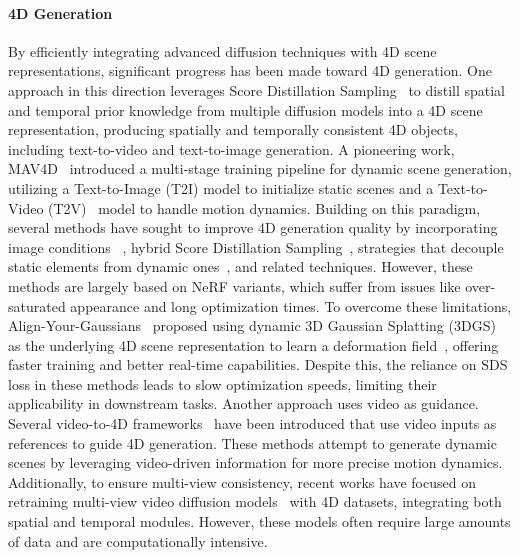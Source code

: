 \paragraph{4D Generation} By efficiently integrating advanced diffusion techniques with 4D scene representations, significant progress has been made toward 4D generation. One approach in this direction leverages Score Distillation Sampling~\citep{poole2022dreamfusion} to distill spatial and temporal prior knowledge from multiple diffusion models into a 4D scene representation, producing spatially and temporally consistent 4D objects, including text-to-video and text-to-image generation. 
A pioneering work, MAV4D~\citep{singer2023mav3d} introduced a multi-stage training pipeline for dynamic scene generation, utilizing a Text-to-Image (T2I) model to initialize static scenes and a Text-to-Video (T2V)~\citep{singer2022makeavideovd} model to handle motion dynamics.
Building on this paradigm, several methods have sought to improve 4D generation quality by incorporating image conditions ~\citep{zhao2023animate124}, hybrid Score Distillation Sampling~\citep{bahmani20244dfy}, strategies that decouple static elements from dynamic ones~\citep{zheng2024dreamin4d}, and related techniques. However, these methods are largely based on NeRF variants, which suffer from issues like over-saturated appearance and long optimization times. To overcome these limitations,  Align-Your-Gaussians~\citep{ling2024alignyourgauss} proposed using dynamic 3D Gaussian Splatting (3DGS)~\citep{kerbl20233dgs} as the underlying 4D scene representation to learn a deformation field~\citep{park2021nerfies,pons2021dnerf}, offering faster training and better real-time capabilities. Despite this, the reliance on SDS loss in these methods leads to slow optimization speeds, limiting their applicability in downstream tasks.
Another approach uses video as guidance. Several video-to-4D frameworks~\citep{jiang2023consistent4d,yin20234dgen,pan2024fastdy4d} have been introduced that use video inputs as references to guide 4D generation. These methods attempt to generate dynamic scenes by leveraging video-driven information for more precise motion dynamics.
Additionally, to ensure multi-view consistency, recent works have focused on retraining multi-view video diffusion models~\citep{zhang20244diffusion,liang2024diffusion4d,li2024vividzoo,ren2024l4gm,jiang2024animate3d} with 4D datasets, integrating both spatial and temporal modules. However, these models often require large amounts of data and are computationally intensive.
